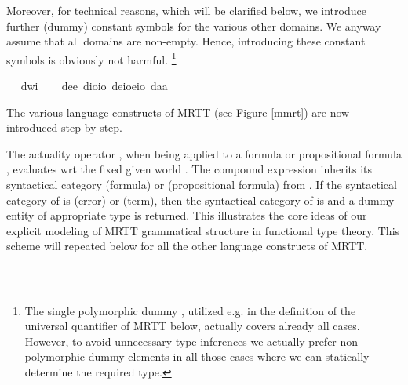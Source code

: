 \begin{isabellebody}
\begin{isamarkuptext}
  Moreover, for technical reasons, 
  which will be clarified below, we introduce further (dummy) constant symbols for the various other domains. 
  We anyway assume that all domains are non-empty. Hence, introducing these constant symbols is obviously not harmful. 
  \footnote{The single polymorphic dummy , utilized e.g. in the definition of the universal 
  quantifier of MRTT below, actually covers already all cases. However, to avoid unnecessary type inferences we
  actually prefer non-polymorphic dummy elements in all those cases where we can statically 
  determine the required type.}%
\end{isamarkuptext}%
\isamarkuptrue%
\ \isamarkupfalse%
\ dw{\isacharcolon}{\isacharcolon}{\isachardoublequoteopen}i{\isachardoublequoteclose}\ \isanewline
\ \isamarkupfalse%
\ de{\isacharcolon}{\isacharcolon}{\isachardoublequoteopen}e{\isachardoublequoteclose}\ dio{\isacharcolon}{\isacharcolon}{\isachardoublequoteopen}io{\isachardoublequoteclose}\ deio{\isacharcolon}{\isacharcolon}{\isachardoublequoteopen}e{\isasymRightarrow}io{\isachardoublequoteclose}\ da{\isacharcolon}{\isacharcolon}{\isachardoublequoteopen}{\isacharprime}a{\isachardoublequoteclose}%
\isamarkuptrue%
%
\begin{isamarkuptext}%
The various language constructs of MRTT (see Figure \ref{mmrt}) are now introduced step by step.%
\end{isamarkuptext}%
\isamarkuptrue%
%
\begin{isamarkuptext}%
The actuality operator \isa{\isactrlbold {\isasymA}}, when being applied to a formula or propositional formula 
  \isa{{\isasymphi}}, evaluates \isa{{\isasymphi}} wrt the fixed given world . 
  The compound expression \isa{\isactrlbold {\isasymA}{\isasymphi}} inherits its syntactical category   (formula) or
   (propositional formula) from \isa{{\isasymphi}}. If the syntactical category of  \isa{{\isasymphi}} is 
   (error) or  (term), then the syntactical category of \isa{\isactrlbold {\isasymA}{\isasymphi}} 
  is  and a dummy entity of appropriate type is returned. This illustrates the core 
  ideas of our explicit modeling of MRTT grammatical structure in functional type theory. 
  This scheme will repeated below for all the other language constructs of MRTT.%
\end{isamarkuptext}%
\isamarkuptrue%
\ \isamarkupfalse%

\end{isabellebody}
